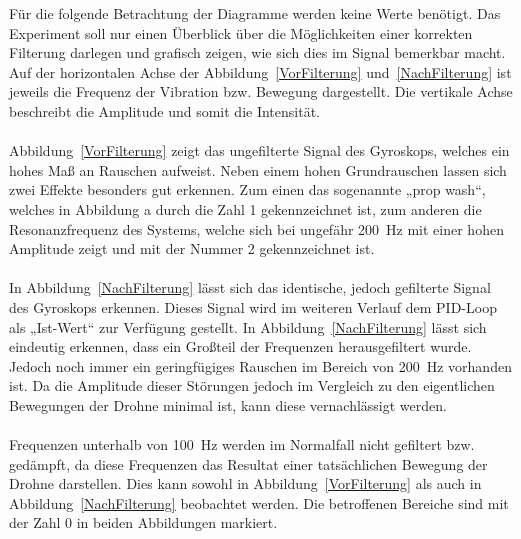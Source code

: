        Für die folgende Betrachtung der Diagramme werden keine Werte benötigt. Das Experiment soll nur
       einen Überblick über die Möglichkeiten einer korrekten Filterung darlegen und grafisch zeigen,
       wie sich dies im Signal bemerkbar macht. Auf der horizontalen Achse der Abbildung~\ref*{VorFilterung}
       und~\ref*{NachFilterung} ist jeweils die Frequenz der Vibration bzw. Bewegung dargestellt.
       Die vertikale Achse beschreibt die Amplitude und somit die Intensität. \\
       \\
       Abbildung~\ref*{VorFilterung} zeigt das ungefilterte Signal des Gyroskops, welches ein hohes Maß an Rauschen aufweist.
       Neben einem hohen Grundrauschen lassen sich zwei Effekte besonders gut erkennen. Zum einen das
       sogenannte „prop wash“, welches in Abbildung a durch die Zahl 1 gekennzeichnet ist, zum anderen
       die Resonanzfrequenz des Systems, welche sich bei ungefähr \qty{200}{\Hz} mit einer hohen Amplitude zeigt
       und mit der Nummer 2 gekennzeichnet ist. \\
       \\
       In Abbildung~\ref*{NachFilterung} lässt sich das identische, jedoch gefilterte Signal des Gyroskops erkennen. Dieses
       Signal wird im weiteren Verlauf dem PID-Loop als „Ist-Wert“ zur Verfügung gestellt. In Abbildung~\ref*{NachFilterung} lässt
       sich eindeutig erkennen, dass ein Großteil der Frequenzen herausgefiltert wurde. Jedoch noch
       immer ein geringfügiges Rauschen im Bereich von \qty{200}{\Hz} vorhanden ist. Da die Amplitude dieser Störungen
       jedoch im Vergleich zu den eigentlichen Bewegungen der Drohne minimal ist, kann diese vernachlässigt werden. \\
       \\
       Frequenzen unterhalb von \qty{100}{\Hz} werden im Normalfall nicht gefiltert bzw. gedämpft, da diese Frequenzen
       das Resultat einer tatsächlichen Bewegung der Drohne darstellen. Dies kann sowohl in Abbildung~\ref*{VorFilterung} als auch
       in Abbildung~\ref*{NachFilterung} beobachtet werden. Die betroffenen Bereiche sind mit der Zahl 0 in beiden Abbildungen markiert.
    \newpage 
